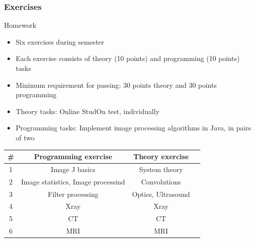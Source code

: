 \begin{frame}
	\frametitle{Exercises}
	\begin{block}{Homework}
		\begin{itemize}
			\item Six exercises during semester
			\item Each exercise consists of theory (10 points) and programming (10 points) tasks
			\item Minimum requirement for passing: 30 points theory and 30 points programming
			\item Theory tasks: Online StudOn test, individually
			\item Programming tasks: Implement image processing algorithms in Java, in pairs of two
		\end{itemize}
		\begin{center}
			\begin{tabular}{c | c | c | c}
				\# & Programming exercise			& Theory exercise \\ \hline
				1  & Image J basics    				& System theory              \\
				2  & Image statistics, Image processind    	& Convolutions                    \\
				3  & Filter processing  				& Optics, Ultrasound           \\
				4  & Xray    						& Xray                	      \\
				5  & CT    							& CT                		     \\
				6  & MRI    						& MRI                	     \\
			\end{tabular}
		\end{center}
	\end{block}
\end{frame}


